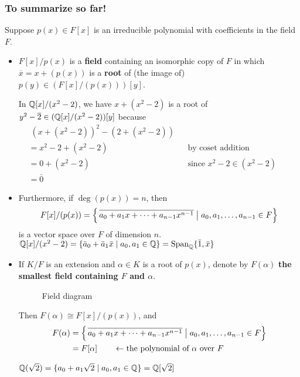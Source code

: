 \documentclass[12pt]{article}
\begin{document}
\subsubsection{To summarize so far!}
Suppose $p(x)\in F[x]$ is an irreducible polynomial with coefficients in the field $F$.
\begin{itemize}
    \item $F[x]/p(x)$ is a \textbf{field} containing an isomorphic copy of $F$ in which $\overline x = x+(p(x))$ is a \textbf{root} of (the image of) $p(y)\in (F[x]/(p(x)))[y]$. 
    
    \eg In $\mathbb{Q}[x]/(x^2-2)$, we have $x+(x^2-2)$ is a root of $y^2-\overline 2\in (\mathbb{Q}[x]/(x^2-2))[y]$ because \begin{align*}
        &\;(x+(x^2-2))^2 - (2+(x^2-2)) \\
        &= x^2-2 + (x^2-2) && \text{by coset addition \& multiplication}\\
        &= 0 + (x^2-2) && \text{since }x^2-2\in (x^2-2)\\
        &= \bar 0
    \end{align*}

    \item Furthermore, if $\deg(p(x))=n$, then $$F[x]/(p(x))=\left \{\,\overline{a_0+a_1x+\dots +a_{n-1}x^{n-1}}\bigm\vert a_0,a_1,\dots,a_{n-1}\in F \right \}$$
    is a vector space over $F$ of dimension $n$.
    \eg $\mathbb{Q}[x]/(x^2-2)=\{\bar a_0 + \bar a_1 \bar x \mid a_0, a_1\in \mathbb{Q}\}=\mathrm{Span}_{\mathbb{Q}} \{\bar 1, \bar x\}$
\end{itemize}
\begin{itemize}
    \item If $K/F$ is an extension and $\alpha\in K$ is a root of $p(x)$, denote by $F(\alpha)$ \textbf{the smallest field containing $F$ and $\alpha$}. 
    \begin{figure}[H]
        \centering
        \caption{Field diagram}
    \end{figure}

    Then $F(\alpha)\cong F[x]/(p(x))$, and \begin{align*}
        F(\alpha)&=\left \{\,\overline{a_0+a_1x+\dots +a_{n-1}x^{n-1}}\bigm\vert a_0,a_1,\dots,a_{n-1}\in F \right \}\\
        &= F[\alpha] \qquad \leftarrow\text{the polynomial of $\alpha$ over $F$}
    \end{align*}

    \eg $\mathbb{Q}(\sqrt{2}) = \{a_0+a_1\sqrt{2}\mid a_0,a_1\in \mathbb{Q}\} = \mathbb{Q}[\sqrt{2}]$
\end{itemize}
\end{document}
